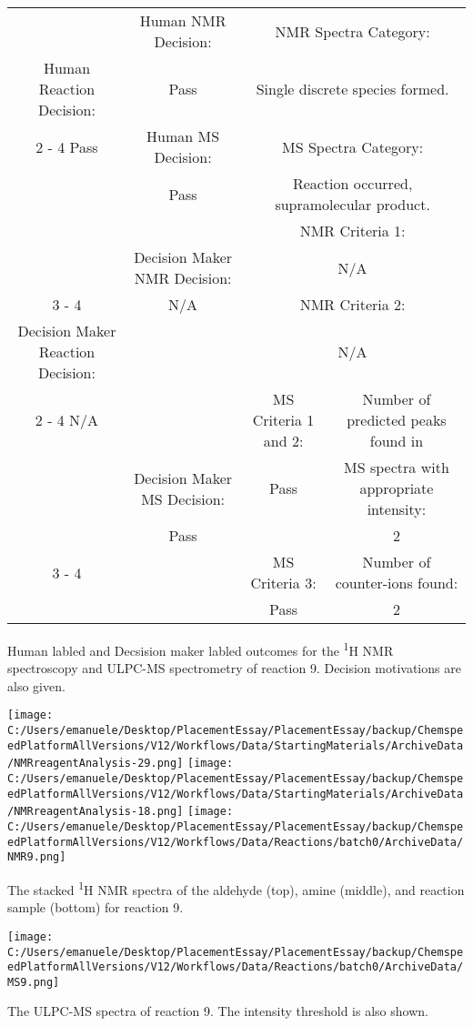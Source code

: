 \documentclass{article}%
\begin{document}
\begin{Decision Table}[H]%
\begin{tabular}{|c|c|c|c|}%
\hline%
&Human NMR Decision:&\multicolumn{2}{|c|}{NMR Spectra Category:}\\%
Human Reaction Decision:&Pass&\multicolumn{2}{|c|}{Single discrete species formed.}\\%
\cline{2%
-%
4}%
Pass&Human MS Decision:&\multicolumn{2}{|c|}{MS Spectra Category:}\\%
&Pass&\multicolumn{2}{|c|}{Reaction occurred, supramolecular product.}\\%
\hline%
&&\multicolumn{2}{|c|}{NMR Criteria 1:}\\%
&Decision Maker NMR Decision:&\multicolumn{2}{|c|}{N/A}\\%
\cline{3%
-%
4}%
&N/A&\multicolumn{2}{|c|}{NMR Criteria 2:}\\%
Decision Maker Reaction Decision:&&\multicolumn{2}{|c|}{N/A}\\%
\cline{2%
-%
4}%
N/A&&MS Criteria 1 and 2:&Number of predicted peaks found in\\%
&Decision Maker MS Decision:&Pass&MS spectra with appropriate intensity:\\%
&Pass&&2\\%
\cline{3%
-%
4}%
&&MS Criteria 3:&Number of counter{-}ions found:\\%
&&Pass&2\\%
\hline%
\end{tabular}%
\caption{Human labled and Decsision maker labled outcomes for the \textsuperscript{1}H NMR spectroscopy and ULPC-MS spectrometry of reaction 9. Decision motivations are also given.}%
\end{Decision Table}%
\begin{NMR Spectra}[H]%
\begin{center}%
\texttt{[image: C:/Users/emanuele/Desktop/PlacementEssay/PlacementEssay/backup/ChemspeedPlatformAllVersions/V12/Workflows/Data/StartingMaterials/ArchiveData/NMRreagentAnalysis-29.png]}\hfill%
\texttt{[image: C:/Users/emanuele/Desktop/PlacementEssay/PlacementEssay/backup/ChemspeedPlatformAllVersions/V12/Workflows/Data/StartingMaterials/ArchiveData/NMRreagentAnalysis-18.png]}\hfill%
\texttt{[image: C:/Users/emanuele/Desktop/PlacementEssay/PlacementEssay/backup/ChemspeedPlatformAllVersions/V12/Workflows/Data/Reactions/batch0/ArchiveData/NMR9.png]}\hfill%
\end{center}%
\caption{The stacked \textsuperscript{1}H NMR spectra of the aldehyde (top), amine (middle), and reaction sample (bottom) for reaction 9.}%
\end{NMR Spectra}%
\begin{MS Spectra}[H]%
\begin{center}%
\texttt{[image: C:/Users/emanuele/Desktop/PlacementEssay/PlacementEssay/backup/ChemspeedPlatformAllVersions/V12/Workflows/Data/Reactions/batch0/ArchiveData/MS9.png]}\hfill%
\end{center}%
\caption{The ULPC-MS spectra of reaction 9. The intensity threshold is also shown.}%
\end{MS Spectra}%
\end{document}
